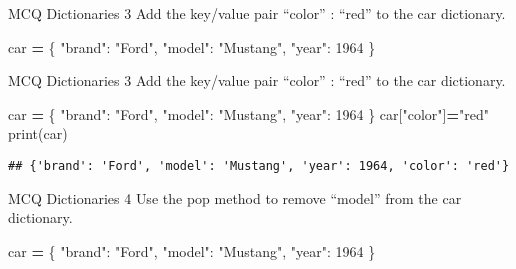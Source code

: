 \documentclass[
  8pt,
  ignorenonframetext,
]{beamer}
\newenvironment{Shaded}{\begin{snugshade}}{\end{snugshade}}
\newcommand{\BuiltInTok}[1]{#1}
\newcommand{\DecValTok}[1]{\textcolor[rgb]{0.00,0.00,0.81}{#1}}
\newcommand{\NormalTok}[1]{#1}
\newcommand{\OperatorTok}[1]{\textcolor[rgb]{0.81,0.36,0.00}{\textbf{#1}}}
\newcommand{\StringTok}[1]{\textcolor[rgb]{0.31,0.60,0.02}{#1}}
\begin{document}
\begin{frame}[fragile]{MCQ Dictionaries 3}
\protect\hypertarget{mcq-dictionaries-3}{}
Add the key/value pair ``color'' : ``red'' to the car dictionary.

\begin{Shaded}
\begin{Highlighting}[]
\NormalTok{car }\OperatorTok{=}\NormalTok{   \{}
  \StringTok{"brand"}\NormalTok{: }\StringTok{"Ford"}\NormalTok{,}
  \StringTok{"model"}\NormalTok{: }\StringTok{"Mustang"}\NormalTok{,}
  \StringTok{"year"}\NormalTok{: }\DecValTok{1964}
\NormalTok{\}}
\end{Highlighting}
\end{Shaded}
\end{frame}

\begin{frame}[fragile]{MCQ Dictionaries 3}
\protect\hypertarget{mcq-dictionaries-3-1}{}
Add the key/value pair ``color'' : ``red'' to the car dictionary.

\begin{Shaded}
\begin{Highlighting}[]
\NormalTok{car }\OperatorTok{=}\NormalTok{   \{}
  \StringTok{"brand"}\NormalTok{: }\StringTok{"Ford"}\NormalTok{,}
  \StringTok{"model"}\NormalTok{: }\StringTok{"Mustang"}\NormalTok{,}
  \StringTok{"year"}\NormalTok{: }\DecValTok{1964}
\NormalTok{\}}
\NormalTok{car[}\StringTok{"color"}\NormalTok{]}\OperatorTok{=}\StringTok{"red"}
\BuiltInTok{print}\NormalTok{(car)}
\end{Highlighting}
\end{Shaded}

\begin{verbatim}
## {'brand': 'Ford', 'model': 'Mustang', 'year': 1964, 'color': 'red'}
\end{verbatim}
\end{frame}

\begin{frame}[fragile]{MCQ Dictionaries 4}
\protect\hypertarget{mcq-dictionaries-4}{}
Use the pop method to remove ``model'' from the car dictionary.

\begin{Shaded}
\begin{Highlighting}[]
\NormalTok{car }\OperatorTok{=}\NormalTok{   \{}
  \StringTok{"brand"}\NormalTok{: }\StringTok{"Ford"}\NormalTok{,}
  \StringTok{"model"}\NormalTok{: }\StringTok{"Mustang"}\NormalTok{,}
  \StringTok{"year"}\NormalTok{: }\DecValTok{1964}
\NormalTok{\}}
\end{Highlighting}
\end{Shaded}
\end{frame}
\end{document}
